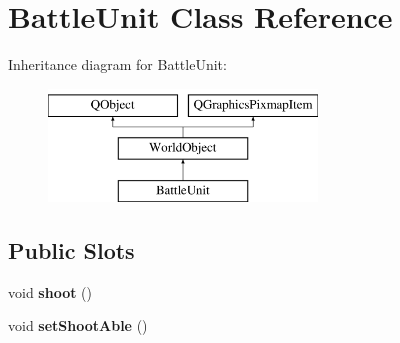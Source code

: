 \hypertarget{class_battle_unit}{}\section{Battle\+Unit Class Reference}
\label{class_battle_unit}
Inheritance diagram for Battle\+Unit\+:\begin{figure}[H]
\begin{center}
\leavevmode
\includegraphics[height=3.000000cm]{class_battle_unit}
\end{center}
\end{figure}
\subsection*{Public Slots}
\begin{DoxyCompactItemize}
\item 
void {\bfseries shoot} ()\hypertarget{class_battle_unit_ad483aca2f0e52cb79c5b0444f6fbd1da}{}\label{class_battle_unit_ad483aca2f0e52cb79c5b0444f6fbd1da}

\item 
void {\bfseries set\+Shoot\+Able} ()\hypertarget{class_battle_unit_a32aaaf8056f9545f231a9bdc368aef8f}{}\label{class_battle_unit_a32aaaf8056f9545f231a9bdc368aef8f}

\end{DoxyCompactItemize}
